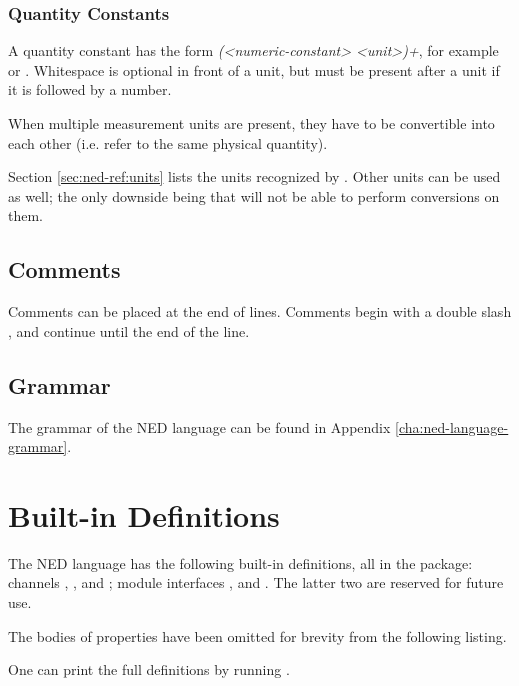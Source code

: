 \subsubsection{Quantity Constants}
\label{sec:ned-ref:quantity-constants}

A quantity constant has the form \textit{(<numeric-constant> <unit>)+}, for
example  or . Whitespace is optional in front
of a unit, but must be present after a unit if it is followed by a number.

When multiple measurement units are present, they have to be convertible
into each other (i.e. refer to the same physical quantity).

Section \ref{sec:ned-ref:units} lists the units recognized by {\opp}.
Other units can be used as well; the only downside being that {\opp} will
not be able to perform conversions on them.


\subsection{Comments}
\label{sec:ned-ref:comments}

Comments can be placed at the end of lines. Comments begin with a double
slash \ttt{//}, and continue until the end of the line.


\subsection{Grammar}
\label{sec:ned-ref:grammar}

The grammar of the NED language can be found in Appendix
\ref{cha:ned-language-grammar}.

\section{Built-in Definitions}
\label{sec:ned-ref:built-in-defs}

The NED language has the following built-in definitions, all in the 
package: channels , , and ;
module interfaces , and .
The latter two are reserved for future use.

The bodies of  properties have been omitted for brevity from
the following listing.

\begin{note}
One can print the full definitions by running .
\end{note}

